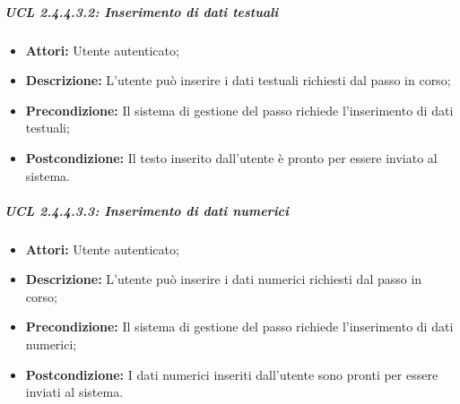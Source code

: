 \subparagraph{UCL 2.4.4.3.2: Inserimento di dati testuali}
\begin{itemize}
\item \textbf{Attori:} Utente autenticato;
\item \textbf{Descrizione:} L'utente può inserire i dati testuali richiesti dal passo in corso;
\item \textbf{Precondizione:} Il sistema di gestione del passo richiede l'inserimento di dati testuali;
\item \textbf{Postcondizione:} Il testo inserito dall'utente è pronto per essere inviato al sistema.
\end{itemize}

\subparagraph{UCL 2.4.4.3.3: Inserimento di dati numerici}
\begin{itemize}
\item \textbf{Attori:} Utente autenticato;
\item \textbf{Descrizione:} L'utente può inserire i dati numerici richiesti dal passo in corso;
\item \textbf{Precondizione:} Il sistema di gestione del passo richiede l'inserimento di dati numerici;
\item \textbf{Postcondizione:} I dati numerici inseriti dall'utente sono pronti per essere inviati al sistema.
\end{itemize}

